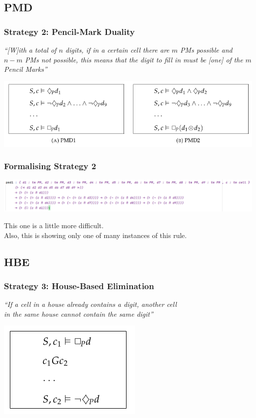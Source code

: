\documentclass[aspectratio=169, usenames, dvipsnames]{beamer}
\begin{document}
\subsection{PMD}
\begin{frame}
\frametitle{Strategy 2: Pencil-Mark Duality}
\begin{center}
\emph{``[W]ith a total of $n$ digits, if in a certain cell there are $m$ PMs possible and $n-m$ PMs not possible, this means that the digit to fill in must be [one] of the $m$ Pencil Marks''}
\bigskip

\includegraphics[height=0.4\textheight,keepaspectratio]{images/strategy_nd_pmd.png} 
\end{center}

\end{frame}

\begin{frame}
\frametitle{Formalising Strategy 2}
\begin{center}
\includegraphics[width=\textwidth, keepaspectratio]{images/strategy_form_pmd.png}
\pause\bigskip

This one is a little more difficult.\\
Also, this is showing only one of many instances of this rule.
\end{center}
\end{frame}

\subsection{HBE}

\begin{frame}
\frametitle{Strategy 3: House-Based Elimination}
\begin{center}
\emph{``If a cell in a house already contains a digit, another cell\\ in the same house cannot contain the same digit''}
\bigskip

\includegraphics[height=0.4\textheight,keepaspectratio]{images/strategy_nd_hbe.png} 
\end{center}

\end{frame}
\end{document}
